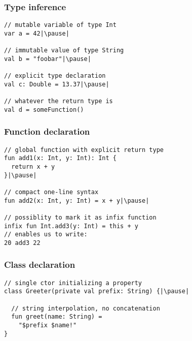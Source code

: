 

\begin{frame}[fragile] \frametitle{Type inference}
\pause
\begin{lstlisting}
// mutable variable of type Int
var a = 42|\pause|

// immutable value of type String
val b = "foobar"|\pause|

// explicit type declaration
val c: Double = 13.37|\pause|

// whatever the return type is
val d = someFunction()
\end{lstlisting}
\end{frame}


\begin{frame}[fragile] \frametitle{Function declaration}
\pause
\begin{lstlisting}
// global function with explicit return type
fun add1(x: Int, y: Int): Int {
  return x + y
}|\pause|

// compact one-line syntax
fun add2(x: Int, y: Int) = x + y|\pause|

// possiblity to mark it as infix function
infix fun Int.add3(y: Int) = this + y
// enables us to write:
20 add3 22
\end{lstlisting}
\end{frame}


\begin{frame}[fragile] \frametitle{Class declaration}
\pause
\begin{lstlisting}
// single ctor initializing a property
class Greeter(private val prefix: String) {|\pause|

  // string interpolation, no concatenation
  fun greet(name: String) =
    "$prefix $name!"
}
\end{lstlisting}
\end{frame}



